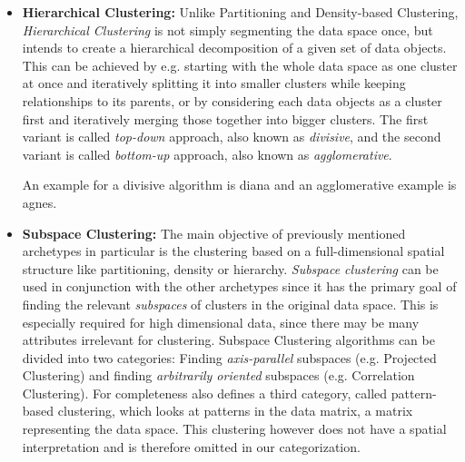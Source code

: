 \begin{itemize}
    \item \textbf{Hierarchical Clustering:} Unlike Partitioning and Density-based Clustering, \textit{Hierarchical Clustering} is not simply segmenting the data space once, but intends to create a hierarchical decomposition of a given set of data objects. This can be achieved by e.g. starting with the whole data space as one cluster at once and iteratively splitting it into smaller clusters while keeping relationships to its parents, or by considering each data objects as a cluster first and iteratively merging those together into bigger clusters. The first variant is called \textit{top-down} approach, also known as \textit{divisive}, and the second variant is called \textit{bottom-up} approach, also known as \textit{agglomerative}\cite[Ch.10.3]{han2011data}. 
    
    An example for a divisive algorithm is \acrshort{diana}\cite[Ch.6]{kaufman2009finding} and an agglomerative example is \acrshort{agnes}\cite[Ch.5]{kaufman2009finding}.
    
    
    \item \textbf{Subspace Clustering:} The main objective of previously mentioned archetypes in particular is the clustering based on a full-dimensional spatial structure like partitioning, density or hierarchy. \textit{Subspace clustering} can be used in conjunction with the other archetypes since it has the primary goal of finding the relevant \textit{subspaces} of clusters in the original data space. This is especially required for high dimensional data, since there may be many attributes irrelevant for clustering\cite{vidal2011subspace}. 
    Subspace Clustering algorithms can be divided into two categories: Finding \textit{axis-parallel} subspaces (e.g. Projected Clustering) and finding \textit{arbitrarily oriented} subspaces (e.g. Correlation Clustering)\cite[Ch.3]{zimek2009correlation}.
    For completeness \textcite{zimek2009correlation} also defines a third category, called pattern-based clustering, which looks at patterns in the data matrix, a matrix representing the data space. This clustering however does not have a spatial interpretation and is therefore omitted in our categorization.
    

\end{itemize}
